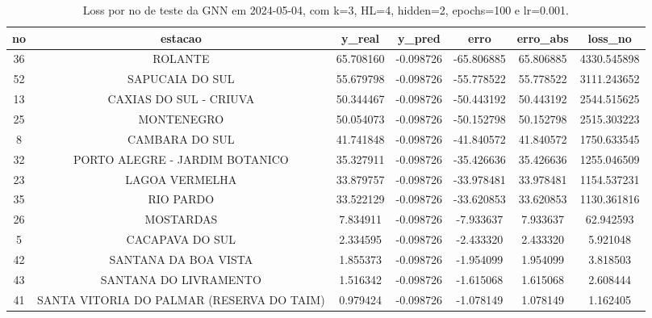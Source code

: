 \begin{table}[h]
\centering
\caption{Loss por no de teste da GNN em 2024-05-04, com k=3, HL=4, hidden=2, epochs=100 e lr=0.001.}
\label{tab:gnn_loss_k3_hl4_h2_e100_d20240504}
\begin{tabular}{ccccccc}
\toprule
no & estacao & y\_real & y\_pred & erro & erro\_abs & loss\_no \\
\midrule
36 & ROLANTE & 65.708160 & -0.098726 & -65.806885 & 65.806885 & 4330.545898 \\
52 & SAPUCAIA DO SUL & 55.679798 & -0.098726 & -55.778522 & 55.778522 & 3111.243652 \\
13 & CAXIAS DO SUL - CRIUVA & 50.344467 & -0.098726 & -50.443192 & 50.443192 & 2544.515625 \\
25 & MONTENEGRO & 50.054073 & -0.098726 & -50.152798 & 50.152798 & 2515.303223 \\
8 & CAMBARA DO SUL & 41.741848 & -0.098726 & -41.840572 & 41.840572 & 1750.633545 \\
32 & PORTO ALEGRE - JARDIM BOTANICO & 35.327911 & -0.098726 & -35.426636 & 35.426636 & 1255.046509 \\
23 & LAGOA VERMELHA & 33.879757 & -0.098726 & -33.978481 & 33.978481 & 1154.537231 \\
35 & RIO PARDO & 33.522129 & -0.098726 & -33.620853 & 33.620853 & 1130.361816 \\
26 & MOSTARDAS & 7.834911 & -0.098726 & -7.933637 & 7.933637 & 62.942593 \\
5 & CACAPAVA DO SUL & 2.334595 & -0.098726 & -2.433320 & 2.433320 & 5.921048 \\
42 & SANTANA DA BOA VISTA & 1.855373 & -0.098726 & -1.954099 & 1.954099 & 3.818503 \\
43 & SANTANA DO LIVRAMENTO & 1.516342 & -0.098726 & -1.615068 & 1.615068 & 2.608444 \\
41 & SANTA VITORIA DO PALMAR (RESERVA DO TAIM) & 0.979424 & -0.098726 & -1.078149 & 1.078149 & 1.162405 \\
\bottomrule
\end{tabular}
\end{table}
